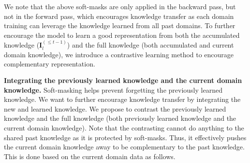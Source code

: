 \documentclass{article} \usepackage{iclr2023_conference,times}
\begin{document}
We note that the above soft-masks are only applied in the backward pass, but not in the forward pass, which encourages knowledge transfer as each domain training can leverage the knowledge learned from all past domains. To further encourage the model to learn a good representation from both the accumulated knowledge ($\bm{I}^{(\le t-1)}_{l}$) and the full knowledge (both accumulated and current domain knowledge), we introduce a contrastive learning method to encourage complementary representation.




\noindent\textbf{Integrating the previously learned knowledge and the current domain knowledge.}
{\color{black}Soft-masking helps prevent forgetting the previously learned knowledge. We want to further encourage knowledge transfer by integrating the new and learned knowledge. We propose to contrast the previously learned knowledge and the full knowledge (both previously learned knowledge and the current domain knowledge). Note that the contrasting cannot do anything to the shared past knowledge as it is protected by soft-masks. Thus, it effectively pushes the current domain knowledge away to be complementary to the past knowledge. This is done based on the current domain data as follows.} 
\end{document}
